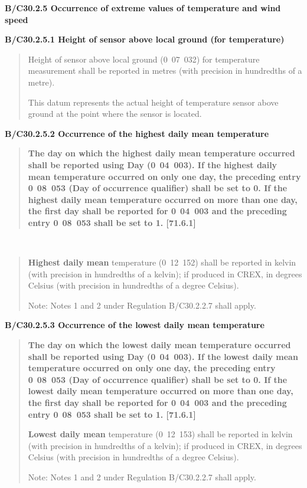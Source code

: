 \textbf{B/C30.2.5 Occurrence of extreme values of temperature and wind speed}

\textbf{B/C30.2.5.1 Height of sensor above local ground (for temperature)}

\begin{quote}
Height of sensor above local ground (0~07~032) for temperature measurement shall be reported in metres (with precision in hundredths of a metre).

This datum represents the actual height of temperature sensor above ground at the point where the sensor is located.
\end{quote}

\textbf{B/C30.2.5.2 Occurrence of the highest daily mean temperature}

\begin{quote}
\textbf{The day on which the highest daily mean temperature occurred shall be reported using Day (0}~\textbf{04~003). If the highest daily mean temperature occurred on only one day, the preceding entry 0}~\textbf{08~053 (Day of occurrence qualifier) shall be set to 0. If the highest daily mean temperature occurred on more than one day, the first day shall be reported for 0}~\textbf{04~003 and the preceding entry 0}~\textbf{08~053 shall be set to 1. {[}71.6.1{]}}
\end{quote}

\textbf{\\
}

\begin{quote}
\textbf{Highest daily mean} temperature (0~12~152) shall be reported in kelvin (with precision in hundredths of a kelvin); if produced in CREX, in degrees Celsius (with precision in hundredths of a degree Celsius).

Note: Notes 1 and 2 under Regulation B/C30.2.2.7 shall apply.
\end{quote}

\textbf{B/C30.2.5.3 Occurrence of the lowest daily mean temperature}

\begin{quote}
\textbf{The day on which the lowest daily mean temperature occurred shall be reported using Day (0}~\textbf{04~003). If the lowest daily mean temperature occurred on only one day, the preceding entry 0}~\textbf{08~053 (Day of occurrence qualifier) shall be set to 0. If the lowest daily mean temperature occurred on more than one day, the first day shall be reported for 0}~\textbf{04~003 and the preceding entry 0}~\textbf{08~053 shall be set to 1. {[}71.6.1{]}}

\textbf{Lowest daily mean} temperature (0~12~153) shall be reported in kelvin (with precision in hundredths of a kelvin); if produced in CREX, in degrees Celsius (with precision in hundredths of a degree Celsius).

Note: Notes 1 and 2 under Regulation B/C30.2.2.7 shall apply.
\end{quote}

